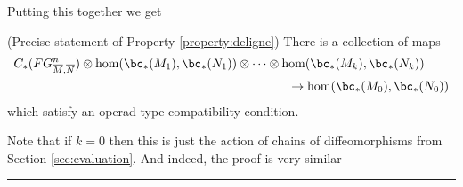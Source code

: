 Putting this together we get 
\begin{prop}(Precise statement of Property \ref{property:deligne})
\label{prop:deligne}
There is a collection of maps
\begin{eqnarray*}
	C_*(FG^n_{\overline{M}, \overline{N}})\otimes \hom(\bc_*(M_1), \bc_*(N_1))\otimes\cdots\otimes 
\hom(\bc_*(M_{k}), \bc_*(N_{k})) & \\
	& \hspace{-11em}\to  \hom(\bc_*(M_0), \bc_*(N_0))
\end{eqnarray*}
which satisfy an operad type compatibility condition. 
\end{prop}

Note that if $k=0$ then this is just the action of chains of diffeomorphisms from Section \ref{sec:evaluation}.
And indeed, the proof is very similar 



\medskip
\hrule\medskip

